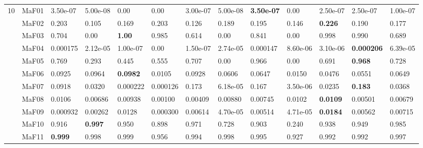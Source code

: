 \documentclass[]{article}
\begin{document}
\begin{landscape}
\begin{table}
\begin{footnotesize}
\begin{tabular}{|l|l|l|l|l|l|l|l|l|l|l|l|l|}
\multirow{15}{*}{10} & MaF01 & \cellcolor{gray95} 3.50e-07 & \cellcolor{gray95} 5.00e-08 & \cellcolor{gray95} 0.00 & \cellcolor{gray95} 0.00 & \cellcolor{gray95} 3.00e-07 & \cellcolor{gray95} 5.00e-08 & \cellcolor{gray95} {\bf 3.50e-07} & \cellcolor{gray95} 0.00 & \cellcolor{gray95} 2.50e-07 & \cellcolor{gray95} 2.50e-07 & \cellcolor{gray95} 1.00e-07\\
 & MaF02 & \cellcolor{gray95} 0.203 & 0.105 & 0.169 & \cellcolor{gray95} 0.203 & 0.126 & 0.189 & 0.195 & 0.146 & \cellcolor{gray95} {\bf 0.226} & 0.190 & 0.177\\
 & MaF03 & 0.704 & 0.00 & \cellcolor{gray95} {\bf 1.00} & 0.985 & 0.614 & 0.00 & 0.841 & 0.00 & \cellcolor{gray95} 0.998 & \cellcolor{gray95} 0.990 & 0.689\\
 & MaF04 & \cellcolor{gray95} 0.000175 & 2.12e-05 & 1.00e-07 & 0.00 & 1.50e-07 & 2.74e-05 & \cellcolor{gray95} 0.000147 & 8.60e-06 & 3.10e-06 & \cellcolor{gray95} {\bf 0.000206} & 6.39e-05\\
 & MaF05 & \cellcolor{gray95} 0.769 & 0.293 & 0.445 & 0.555 & 0.707 & 0.00 & \cellcolor{gray95} 0.966 & 0.00 & 0.691 & \cellcolor{gray95} {\bf 0.968} & \cellcolor{gray95} 0.728\\
 & MaF06 & \cellcolor{gray95} 0.0925 & \cellcolor{gray95} 0.0964 & \cellcolor{gray95} {\bf 0.0982} & 0.0105 & \cellcolor{gray95} 0.0928 & 0.0606 & 0.0647 & 0.0150 & 0.0476 & 0.0551 & 0.0649\\
 & MaF07 & \cellcolor{gray95} 0.0918 & 0.0320 & 0.000222 & 0.000126 & \cellcolor{gray95} 0.173 & 6.18e-05 & \cellcolor{gray95} 0.167 & 3.50e-06 & 0.0235 & \cellcolor{gray95} {\bf 0.183} & 0.0368\\
 & MaF08 & \cellcolor{gray95} 0.0106 & 0.00686 & \cellcolor{gray95} 0.00938 & 0.00100 & 0.00409 & 0.00880 & 0.00745 & \cellcolor{gray95} 0.0102 & \cellcolor{gray95} {\bf 0.0109} & 0.00501 & 0.00679\\
 & MaF09 & 0.000932 & 0.00262 & \cellcolor{gray95} 0.0128 & 0.000300 & 0.00614 & 4.70e-05 & 0.00514 & 4.71e-05 & \cellcolor{gray95} {\bf 0.0184} & 0.00562 & \cellcolor{gray95} 0.00715\\
 & MaF10 & 0.916 & \cellcolor{gray95} {\bf 0.997} & 0.950 & 0.898 & \cellcolor{gray95} 0.971 & 0.728 & 0.903 & 0.240 & 0.938 & 0.949 & \cellcolor{gray95} 0.985\\
 & MaF11 & \cellcolor{gray95} {\bf 0.999} & \cellcolor{gray95} 0.998 & \cellcolor{gray95} 0.999 & 0.956 & 0.994 & \cellcolor{gray95} 0.998 & 0.995 & 0.927 & 0.992 & 0.992 & 0.997\\

\end{tabular}
\end{footnotesize}
\end{table}
\end{landscape}
\end{document}
